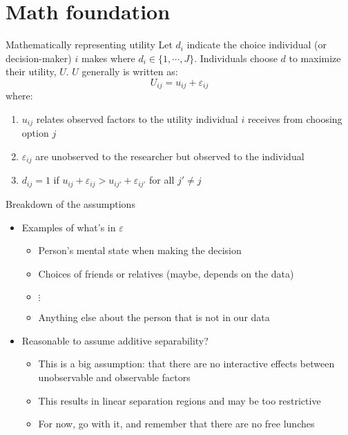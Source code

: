 \documentclass[english,aspectratio=169,12pt,xcolor=dvipsnames]{beamer}
\begin{document}
\section{Math foundation}
\begin{frame}{Mathematically representing utility}
Let $d_i$ indicate the choice individual (or decision-maker) $i$ makes where $d_i\in\{1,\cdots, J\}$.
Individuals choose $d$ to maximize their utility, $U$.  $U$ generally is written as:
\begin{equation}
U_{ij}=u_{ij}+\varepsilon_{ij}
\end{equation}
where:
\begin{enumerate}
\item  $u_{ij}$ relates observed factors to the utility individual $i$ receives from choosing option $j$
\item $\varepsilon_{ij}$ are unobserved to the researcher but observed to the individual
\item $d_{ij}=1$ if $u_{ij}+\varepsilon_{ij}>u_{ij'}+\varepsilon_{ij'}$ for all $j'\neq j$
\end{enumerate}
\end{frame}



\begin{frame}{Breakdown of the assumptions}
\begin{itemize}
\item Examples of what's in $\varepsilon$
    \begin{itemize}
    \item Person's mental state when making the decision
    \item Choices of friends or relatives (maybe, depends on the data)
    \item $\vdots$
    \item Anything else about the person that is not in our data
    \end{itemize}
\item Reasonable to assume additive separability?
    \begin{itemize}
    \item This is a big assumption: that there are no interactive effects between unobservable and observable factors
    \item This results in linear separation regions and may be too restrictive
    \item For now, go with it, and remember that there are no free lunches
    \end{itemize}
\end{itemize}
\end{frame}
\end{document}
